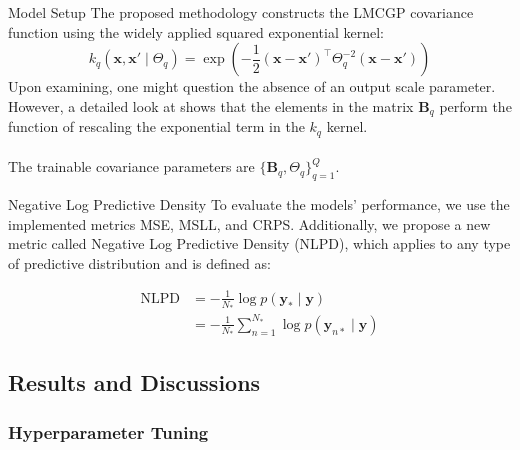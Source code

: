 \begin{frame}{Model Setup}
	The proposed methodology constructs the LMCGP covariance function using the widely applied squared exponential kernel:
	\begin{equation*}\label{eq:nonscaled_squared_exponential_kernel}
		k_{q}\left(\mathbf{x}, \mathbf{x'} \mid \Theta_q \right) = \exp\left(-\frac{1}{2}(\mathbf{x} - \mathbf{x'})^\top \Theta_q^{-2} (\mathbf{x} - \mathbf{x'})\right)
	\end{equation*}
	Upon examining, one might question the absence of an output scale parameter. However, a detailed look at shows that the elements in the matrix $\mathbf{B}_q$ perform the function of rescaling the exponential term in the $k_q$ kernel.\\~\\ 
	The trainable covariance parameters are $\{ \mathbf{B}_q, \Theta_q\}_{q=1}^Q$.
\end{frame}

\begin{frame}{Negative Log Predictive Density}
	To evaluate the models' performance, we use the implemented metrics MSE, MSLL, and CRPS. Additionally, we propose a new metric called Negative Log Predictive Density (NLPD), which applies to any type of predictive distribution and is defined as:
	
	\begin{equation*}
		\begin{split}
			\text{NLPD} &= -\frac{1}{N_*}\log p(\mathbf{y}_* \mid \mathbf{y})\\
			&= -\frac{1}{N_*}\sum_{n=1}^{N_*} \log p(\mathbf{y}_{n*} \mid \mathbf{y}) 
		\end{split}
	\end{equation*}
\end{frame}

\subsection{Results and Discussions}

\subsubsection{Hyperparameter Tuning}

